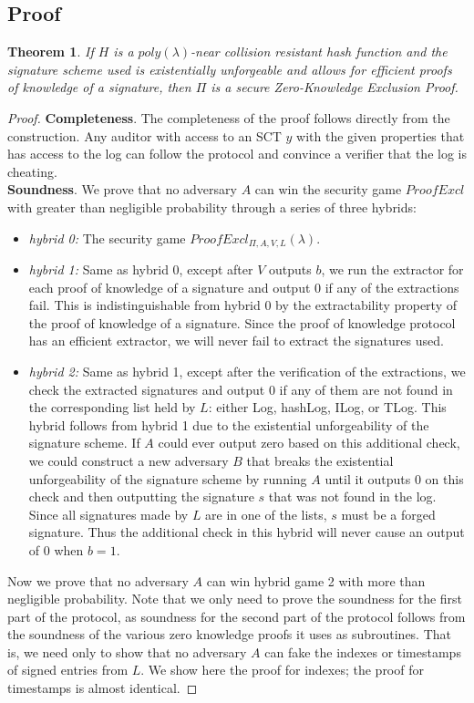 \documentclass[letterpaper,twocolumn,10pt]{article}
\newtheorem{theorem}{Theorem}
\begin{document}
\subsection{Proof}
\begin{theorem}
If $H$ is a $poly(\lambda)$-near collision resistant hash function and the signature scheme used is existentially unforgeable and allows for efficient proofs of knowledge of a signature, then $\Pi$ is a secure Zero-Knowledge Exclusion Proof. 
\end{theorem}
\begin{proof}
\textbf{Completeness}. The completeness of the proof follows directly from the construction. Any auditor with access to an SCT $y$ with the given properties that has access to the log can follow the protocol and convince a verifier that the log is cheating.\\

\textbf{Soundness}. We prove that no adversary $A$ can win the security game $ProofExcl$ with greater than negligible probability through a series of three hybrids:
\begin{itemize}
\item \emph{hybrid 0:} The security game $ProofExcl_{\Pi,A,V,L}(\lambda)$.
\item \emph{hybrid 1:} Same as hybrid 0, except after $V$ outputs $b$, we run the extractor for each proof of knowledge of a signature and output 0 if any of the extractions fail. This is indistinguishable from hybrid 0 by the extractability property of the proof of knowledge of a signature. Since the proof of knowledge protocol has an efficient extractor, we will never fail to extract the signatures used.
\item \emph{hybrid 2:} Same as hybrid 1, except after the verification of the extractions, we check the extracted signatures and output 0 if any of them are not found in the corresponding list held by $L$: either Log, hashLog, ILog, or TLog. This hybrid follows from hybrid 1 due to the existential unforgeability of the signature scheme. If $A$ could ever output zero based on this additional check, we could construct a new adversary $B$ that breaks the existential unforgeability of the signature scheme by running $A$ until it outputs 0 on this check and then outputting the signature $s$ that was not found in the log. Since all signatures made by $L$ are in one of the lists, $s$ must be a forged signature. Thus the additional check in this hybrid will never cause an output of 0 when $b=1$. 
\end{itemize}
Now we prove that no adversary $A$ can win hybrid game 2 with more than negligible probability. Note that we only need to prove the soundness for the first part of the protocol, as soundness for the second part of the protocol follows from the soundness of the various zero knowledge proofs it uses as subroutines. That is, we need only to show that no adversary $A$ can fake the indexes or timestamps of signed entries from $L$. We show here the proof for indexes; the proof for timestamps is almost identical. 


\end{proof}
\end{document}
